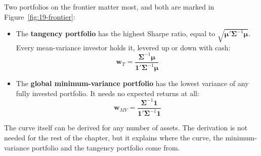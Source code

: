 Two portfolios on the frontier matter most, and both are marked in Figure~\ref{fig:19-frontier}:

\begin{itemize}
  \item The \textbf{tangency portfolio} has the highest Sharpe ratio, equal to $\sqrt{\boldsymbol{\mu}'\boldsymbol{\Sigma}^{-1}\boldsymbol{\mu}}$. Every mean-variance investor holds it, levered up or down with cash:
  \begin{equation}
    \mathbf{w}_T = \frac{\boldsymbol{\Sigma}^{-1}\boldsymbol{\mu}}{\mathbf{1}'\boldsymbol{\Sigma}^{-1}\boldsymbol{\mu}}
    \label{eq:19-tangency}
  \end{equation}
  \item The \textbf{global minimum-variance portfolio} has the lowest variance of any fully invested portfolio. It needs no expected returns at all:
  \begin{equation}
    \mathbf{w}_{MV} = \frac{\boldsymbol{\Sigma}^{-1}\mathbf{1}}{\mathbf{1}'\boldsymbol{\Sigma}^{-1}\mathbf{1}}
    \label{eq:19-minvar}
  \end{equation}
\end{itemize}

The curve itself can be derived for any number of assets. The derivation is not needed for the rest of the chapter, but it explains where the curve, the minimum-variance portfolio and the tangency portfolio come from.

